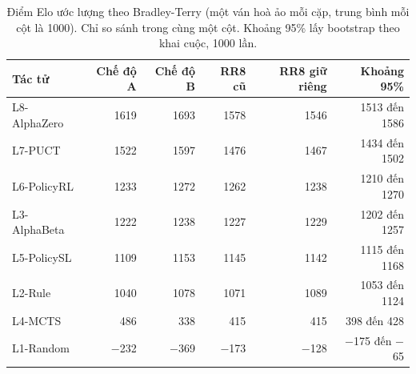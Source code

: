 \begin{table}[H]
  \centering\small
  \caption{Điểm Elo ước lượng theo Bradley-Terry (một ván hoà ảo mỗi cặp, trung bình mỗi cột là 1000). Chỉ so sánh trong cùng một cột. Khoảng 95\% lấy bootstrap theo khai cuộc, 1000 lần.}
  \label{tab:elo}
  \setlength{\tabcolsep}{4pt}
  \begin{tabular}{@{}lrrrrr@{}}
    \toprule
    Tác tử & Chế độ A & Chế độ B & RR8 cũ & RR8 giữ riêng & Khoảng 95\% \\
    \midrule
    L8-AlphaZero & 1619 & 1693 & 1578 & 1546 & 1513 đến 1586 \\
    L7-PUCT & 1522 & 1597 & 1476 & 1467 & 1434 đến 1502 \\
    L6-PolicyRL & 1233 & 1272 & 1262 & 1238 & 1210 đến 1270 \\
    L3-AlphaBeta & 1222 & 1238 & 1227 & 1229 & 1202 đến 1257 \\
    L5-PolicySL & 1109 & 1153 & 1145 & 1142 & 1115 đến 1168 \\
    L2-Rule & 1040 & 1078 & 1071 & 1089 & 1053 đến 1124 \\
    L4-MCTS & 486 & 338 & 415 & 415 & 398 đến 428 \\
    L1-Random & $-$232 & $-$369 & $-$173 & $-$128 & $-$175 đến $-$65 \\
    \bottomrule
  \end{tabular}
\end{table}
